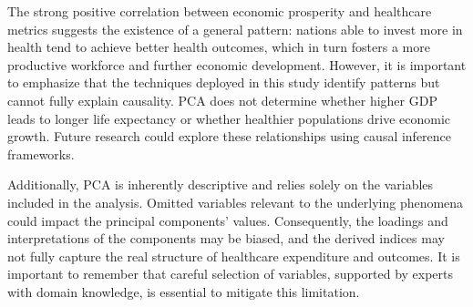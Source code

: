 \documentclass[11pt, a4paper]{article}
\begin{document}
The strong positive correlation between economic prosperity and healthcare metrics suggests the existence of a general pattern: nations able to invest more in health tend to achieve better health outcomes, which in turn fosters a more productive workforce and further economic development. However, it is important to emphasize that the techniques deployed in this study identify patterns but cannot fully explain causality. PCA does not determine whether higher GDP leads to longer life expectancy or whether healthier populations drive economic growth. Future research could explore these relationships using causal inference frameworks.  

Additionally, PCA is inherently descriptive and relies solely on the variables included in the analysis. Omitted variables relevant to the underlying phenomena could impact the principal components' values. Consequently, the loadings and interpretations of the components may be biased, and the derived indices may not fully capture the real structure of healthcare expenditure and outcomes. It is important to remember that careful selection of variables, supported by experts with domain knowledge, is essential to mitigate this limitation. 


\printbibliography
\end{document}
